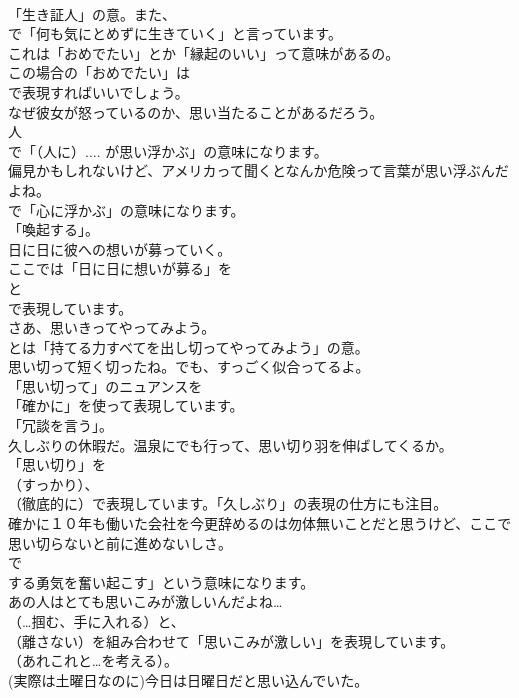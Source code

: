 \documentclass[8pt]{extreport}
\begin{document}
\begin{CJK}{UTF8}{min}
\\	「生き証人」の意。また、
\\	で「何も気にとめずに生きていく」と言っています。	
\\	これは「おめでたい」とか「縁起のいい」って意味があるの。 
\\	この場合の「おめでたい」は 
\\	で表現すればいいでしょう。	
\\	なぜ彼女が怒っているのか、思い当たることがあるだろう。 
\\	人 
\\	で「（人に）.... が思い浮かぶ」の意味になります。	
\\	偏見かもしれないけど、アメリカって聞くとなんか危険って言葉が思い浮ぶんだよね。 
\\	で「心に浮かぶ」の意味になります。
\\	「喚起する」。	
\\	日に日に彼への想いが募っていく。 
\\	ここでは「日に日に想いが募る」を 
\\	と 
\\	で表現しています。	
\\	さあ、思いきってやってみよう。 
\\	とは「持てる力すべてを出し切ってやってみよう」の意。	
\\	思い切って短く切ったね。でも、すっごく似合ってるよ。 
\\	「思い切って」のニュアンスを
\\	「確かに」を使って表現しています。
\\	「冗談を言う」。	
\\	久しぶりの休暇だ。温泉にでも行って、思い切り羽を伸ばしてくるか。 
\\	「思い切り」を 
\\	（すっかり）、
\\	（徹底的に）で表現しています。「久しぶり」の表現の仕方にも注目。	
\\	確かに１０年も働いた会社を今更辞めるのは勿体無いことだと思うけど、ここで思い切らないと前に進めないしさ。 
\\	で
\\	する勇気を奮い起こす」という意味になります。	
\\	あの人はとても思いこみが激しいんだよね… 
\\	（…掴む、手に入れる）と、
\\	（離さない）を組み合わせて「思いこみが激しい」を表現しています。
\\	（あれこれと…を考える）。	
\\	(実際は土曜日なのに)今日は日曜日だと思い込んでいた。 

\end{CJK}
\end{document}
